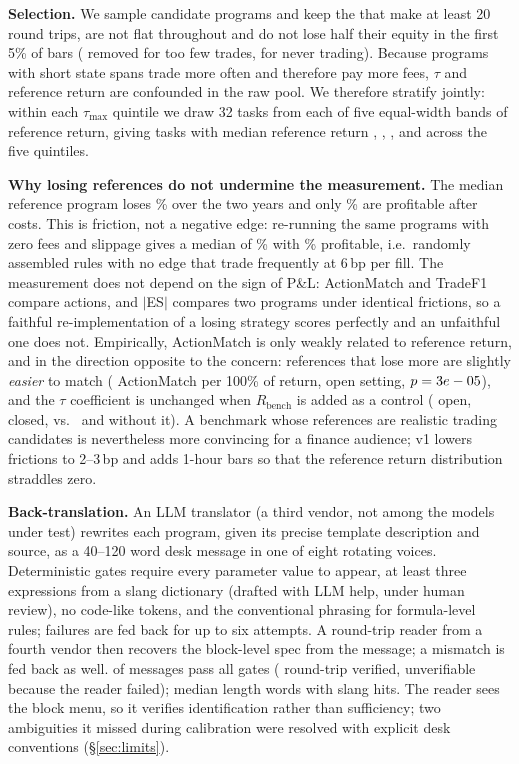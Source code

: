\documentclass[sigconf,nonacm]{acmart}
\begin{document}
\textbf{Selection.} We sample \NPool{} candidate programs and keep the \NPoolKept{} that make at least
20 round trips, are not flat throughout and do not lose half their equity in the first 5\% of bars
(\NFewTrades{} removed for too few trades, \NAlwaysFlat{} for never trading). Because programs with
short state spans trade more often and therefore pay more fees, $\tau$ and reference return are
confounded in the raw pool. We therefore stratify jointly: within each $\tau_{\max}$ quintile we draw
32 tasks from each of five equal-width bands of reference return, giving \NTasks{} tasks with median
reference return \RMedBinA, \RMedBinB, \RMedBinC, \RMedBinD{} and \RMedBinE{} across the five quintiles.

\textbf{Why losing references do not undermine the measurement.} The median reference program
loses \RNetMed\% over the two years and only \ShareNetPos\% are profitable after costs. This is
friction, not a negative edge: re-running the same programs with zero fees and slippage gives a
median of \RGrossMed\% with \ShareGrossPos\% profitable, i.e.\ randomly assembled rules with no edge
that trade frequently at 6\,bp per fill. The measurement does not depend on the sign of P\&L:
ActionMatch and TradeF1 compare actions, and $|$ES$|$ compares two programs under identical
frictions, so a faithful re-implementation of a losing strategy scores perfectly and an unfaithful
one does not. Empirically, ActionMatch is only weakly related to reference return, and in the
direction opposite to the concern: references that lose more are slightly \emph{easier} to match
(\RegOpenRonly{} ActionMatch per 100\% of return, open setting, $p=3e-05$), and the $\tau$
coefficient is unchanged when $R_{\text{bench}}$ is added as a control (\RegOpenTauGivenR{} open,
\RegClosedTauGivenR{} closed, vs.\ \RegOpenTauOnlyTau{} and \RegClosedTauOnlyTau{} without it). A
benchmark whose references are realistic trading candidates is nevertheless more convincing for a
finance audience; v1 lowers frictions to 2--3\,bp and adds 1-hour bars so that the reference return
distribution straddles zero.

\textbf{Back-translation.} An LLM translator (a third vendor, not among the models under test)
rewrites each program, given its precise template description and source, as a 40--120 word desk
message in one of eight rotating voices. Deterministic gates require every parameter value to appear,
at least three expressions from a slang dictionary (drafted with LLM help, under human review), no
code-like tokens, and the conventional phrasing for formula-level rules; failures are fed back for up
to six attempts. A round-trip reader from a fourth vendor then recovers the block-level spec from the
message; a mismatch is fed back as well. \NValidPrompts{} of \NTasks{} messages pass all gates
(\NRoundTripOK{} round-trip verified, \NRoundTripNA{} unverifiable because the reader failed); median
length \MedWords{} words with \MedJargon{} slang hits. The reader sees the block menu, so it verifies
identification rather than sufficiency; two ambiguities it missed during calibration were resolved
with explicit desk conventions (\S\ref{sec:limits}).
\end{document}
